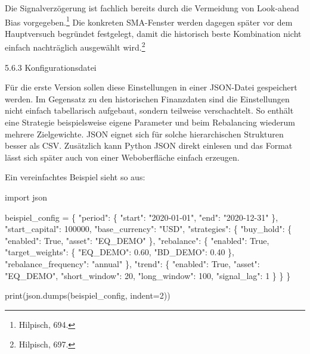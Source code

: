 \documentclass[
  ngerman,
  a4paper,
  DIV=11,
  oneside]{scrreprt}
\newenvironment{Shaded}{\begin{snugshade}}{\end{snugshade}}
\newcommand{\BuiltInTok}[1]{\textcolor[rgb]{0.00,0.23,0.31}{#1}}
\newcommand{\DecValTok}[1]{\textcolor[rgb]{0.68,0.00,0.00}{#1}}
\newcommand{\FloatTok}[1]{\textcolor[rgb]{0.68,0.00,0.00}{#1}}
\newcommand{\ImportTok}[1]{\textcolor[rgb]{0.00,0.46,0.62}{#1}}
\newcommand{\NormalTok}[1]{\textcolor[rgb]{0.00,0.23,0.31}{#1}}
\newcommand{\OperatorTok}[1]{\textcolor[rgb]{0.37,0.37,0.37}{#1}}
\newcommand{\StringTok}[1]{\textcolor[rgb]{0.13,0.47,0.30}{#1}}
\newcommand{\VariableTok}[1]{\textcolor[rgb]{0.07,0.07,0.07}{#1}}
\begin{document}
Die Signalverzögerung ist fachlich bereits durch die Vermeidung von
Look-ahead Bias vorgegeben.\footnote{Hilpisch, 694.} Die konkreten
SMA-Fenster werden dagegen später vor dem Hauptversuch begründet
festgelegt, damit die historisch beste Kombination nicht einfach
nachträglich ausgewählt wird.\footnote{Hilpisch, 697.}

5.6.3 Konfigurationsdatei

Für die erste Version sollen diese Einstellungen in einer JSON-Datei
gespeichert werden. Im Gegensatz zu den historischen Finanzdaten sind
die Einstellungen nicht einfach tabellarisch aufgebaut, sondern
teilweise verschachtelt. So enthält eine Strategie beispielsweise eigene
Parameter und beim Rebalancing wiederum mehrere Zielgewichte. JSON
eignet sich für solche hierarchischen Strukturen besser als CSV.
Zusätzlich kann Python JSON direkt einlesen und das Format lässt sich
später auch von einer Weboberfläche einfach erzeugen.

Ein vereinfachtes Beispiel sieht so aus:

\begin{Shaded}
\begin{Highlighting}[]
\ImportTok{import}\NormalTok{ json}

\NormalTok{beispiel\_config }\OperatorTok{=}\NormalTok{ \{}
    \StringTok{"period"}\NormalTok{: \{}
        \StringTok{"start"}\NormalTok{: }\StringTok{"2020{-}01{-}01"}\NormalTok{,}
        \StringTok{"end"}\NormalTok{: }\StringTok{"2020{-}12{-}31"}
\NormalTok{    \},}
    \StringTok{"start\_capital"}\NormalTok{: }\DecValTok{100000}\NormalTok{,}
    \StringTok{"base\_currency"}\NormalTok{: }\StringTok{"USD"}\NormalTok{,}
    \StringTok{"strategies"}\NormalTok{: \{}
        \StringTok{"buy\_hold"}\NormalTok{: \{}
            \StringTok{"enabled"}\NormalTok{: }\VariableTok{True}\NormalTok{,}
            \StringTok{"asset"}\NormalTok{: }\StringTok{"EQ\_DEMO"}
\NormalTok{        \},}
        \StringTok{"rebalance"}\NormalTok{: \{}
            \StringTok{"enabled"}\NormalTok{: }\VariableTok{True}\NormalTok{,}
            \StringTok{"target\_weights"}\NormalTok{: \{}
                \StringTok{"EQ\_DEMO"}\NormalTok{: }\FloatTok{0.60}\NormalTok{,}
                \StringTok{"BD\_DEMO"}\NormalTok{: }\FloatTok{0.40}
\NormalTok{            \},}
            \StringTok{"rebalance\_frequency"}\NormalTok{: }\StringTok{"annual"}
\NormalTok{        \},}
        \StringTok{"trend"}\NormalTok{: \{}
            \StringTok{"enabled"}\NormalTok{: }\VariableTok{True}\NormalTok{,}
            \StringTok{"asset"}\NormalTok{: }\StringTok{"EQ\_DEMO"}\NormalTok{,}
            \StringTok{"short\_window"}\NormalTok{: }\DecValTok{20}\NormalTok{,}
            \StringTok{"long\_window"}\NormalTok{: }\DecValTok{100}\NormalTok{,}
            \StringTok{"signal\_lag"}\NormalTok{: }\DecValTok{1}
\NormalTok{        \}}
\NormalTok{    \}}
\NormalTok{\}}

\BuiltInTok{print}\NormalTok{(json.dumps(beispiel\_config, indent}\OperatorTok{=}\DecValTok{2}\NormalTok{))}
\end{Highlighting}
\end{Shaded}
\end{document}
